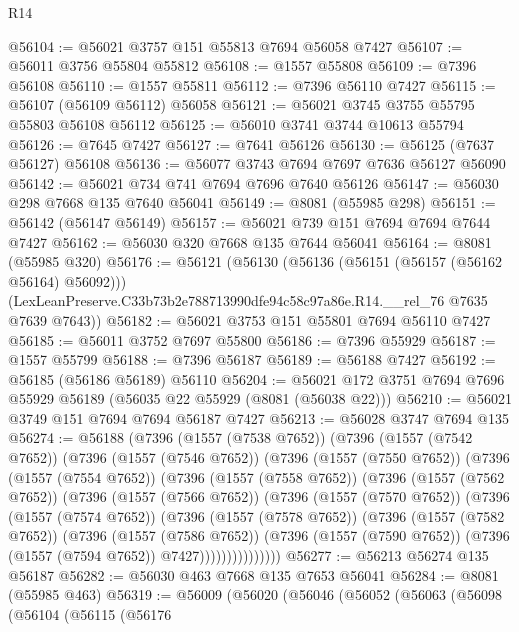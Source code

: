 \begin{lexlean}{R14}
\begin{coremodule}
@56104 := @56021 @3757 @151 @55813 @7694 @56058 @7427
@56107 := @56011 @3756 @55804 @55812
@56108 := @1557 @55808
@56109 := @7396 @56108
@56110 := @1557 @55811
@56112 := @7396 @56110 @7427
@56115 := @56107 (@56109 @56112) @56058
@56121 := @56021 @3745 @3755 @55795 @55803 @56108 @56112
@56125 := @56010 @3741 @3744 @10613 @55794
@56126 := @7645 @7427
@56127 := @7641 @56126
@56130 := @56125 (@7637 @56127) @56108
@56136 := @56077 @3743 @7694 @7697 @7636 @56127 @56090
@56142 := @56021 @734 @741 @7694 @7696 @7640 @56126
@56147 := @56030 @298 @7668 @135 @7640 @56041
@56149 := @8081 (@55985 @298)
@56151 := @56142 (@56147 @56149)
@56157 := @56021 @739 @151 @7694 @7694 @7644 @7427
@56162 := @56030 @320 @7668 @135 @7644 @56041
@56164 := @8081 (@55985 @320)
@56176 := @56121
    (@56130
      (@56136 (@56151 (@56157 (@56162 @56164) @56092)))
      (LexLeanPreserve.C33b73b2e788713990dfe94c58c97a86e.R14.__rel_76 @7635 @7639 @7643))
@56182 := @56021 @3753 @151 @55801 @7694 @56110 @7427
@56185 := @56011 @3752 @7697 @55800
@56186 := @7396 @55929
@56187 := @1557 @55799
@56188 := @7396 @56187
@56189 := @56188 @7427
@56192 := @56185 (@56186 @56189) @56110
@56204 := @56021 @172 @3751 @7694 @7696 @55929 @56189 (@56035 @22 @55929 (@8081 (@56038 @22)))
@56210 := @56021 @3749 @151 @7694 @7694 @56187 @7427
@56213 := @56028 @3747 @7694 @135
@56274 := @56188
    (@7396
      (@1557 (@7538 @7652))
      (@7396
        (@1557 (@7542 @7652))
        (@7396
          (@1557 (@7546 @7652))
          (@7396
            (@1557 (@7550 @7652))
            (@7396
              (@1557 (@7554 @7652))
              (@7396
                (@1557 (@7558 @7652))
                (@7396
                  (@1557 (@7562 @7652))
                  (@7396
                    (@1557 (@7566 @7652))
                    (@7396
                      (@1557 (@7570 @7652))
                      (@7396
                        (@1557 (@7574 @7652))
                        (@7396
                          (@1557 (@7578 @7652))
                          (@7396
                            (@1557 (@7582 @7652))
                            (@7396
                              (@1557 (@7586 @7652))
                              (@7396
                                (@1557 (@7590 @7652))
                                (@7396 (@1557 (@7594 @7652)) @7427)))))))))))))))
@56277 := @56213 @56274 @135 @56187
@56282 := @56030 @463 @7668 @135 @7653 @56041
@56284 := @8081 (@55985 @463)
@56319 := @56009
    (@56020
      (@56046
        (@56052
          (@56063
            (@56098
              (@56104
                (@56115
                  (@56176

\end{coremodule}
\end{lexlean}
